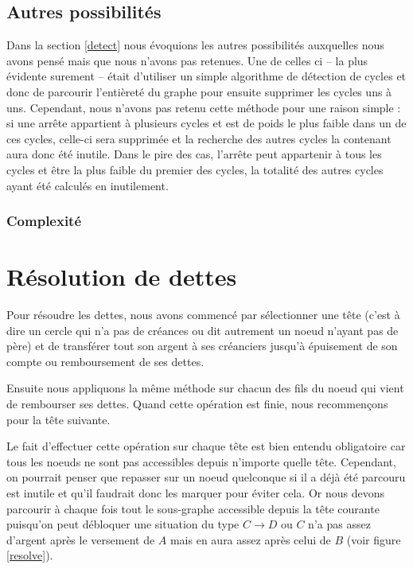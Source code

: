 \documentclass[12pt, oneside]{article}
\begin{document}
\subsection{Autres possibilités}
\label{others}

Dans la section \ref{detect} nous évoquions les autres possibilités auxquelles nous avons pensé mais que nous n'avons pas retenues. Une de celles ci -- la plus évidente surement -- était d'utiliser un simple algorithme de détection de cycles et donc de parcourir l'entièreté du graphe pour ensuite supprimer les cycles uns à uns. Cependant, nous n'avons pas retenu cette méthode pour une raison simple : si une arrête appartient à plusieurs cycles et est de poids le plus faible dans un de ces cycles, celle-ci sera supprimée et la recherche des autres cycles la contenant aura donc été inutile. Dans le pire des cas, l'arrête peut appartenir à tous les cycles et être la plus faible du premier des cycles, la totalité des autres cycles ayant été calculés en inutilement.


\subsubsection{Complexité}


\section{Résolution de dettes}
Pour résoudre les dettes, nous avons commencé par sélectionner une tête (c'est à dire un cercle qui n'a pas de créances ou dit autrement un noeud n'ayant pas de père) et de transférer tout son argent à ses créanciers jusqu'à épuisement de son compte ou remboursement de ses dettes.

Ensuite nous appliquons la même méthode sur chacun des fils du noeud qui vient de rembourser ses dettes. Quand cette opération est finie, nous recommençons pour la tête suivante.

Le fait d'effectuer cette opération sur chaque tête est bien entendu obligatoire car tous les noeuds ne sont pas accessibles depuis n'importe quelle tête. Cependant, on pourrait penser que repasser sur un noeud quelconque si il a déjà été parcouru est inutile et qu'il faudrait donc les marquer pour éviter cela. Or nous devons parcourir à chaque fois tout le sous-graphe accessible depuis la tête courante puisqu'on peut débloquer une situation du type $C \rightarrow D$ ou $C$ n'a pas assez d'argent après le versement de $A$ mais en aura assez après celui de $B$ (voir figure \ref{resolve}).
\end{document}
